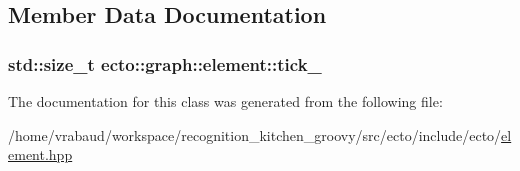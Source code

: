\subsection{\-Member \-Data \-Documentation}
\hypertarget{classecto_1_1graph_1_1element_a6f850cead9edb37941344fdbd40ae112}{
\subsubsection[{tick\-\_\-}]{\setlength{\rightskip}{0pt plus 5cm}std\-::size\-\_\-t {\bf ecto\-::graph\-::element\-::tick\-\_\-}}}\label{classecto_1_1graph_1_1element_a6f850cead9edb37941344fdbd40ae112}


\-The documentation for this class was generated from the following file\-:\begin{DoxyCompactItemize}
\item 
/home/vrabaud/workspace/recognition\-\_\-kitchen\-\_\-groovy/src/ecto/include/ecto/\hyperlink{element_8hpp}{element.\-hpp}\end{DoxyCompactItemize}
